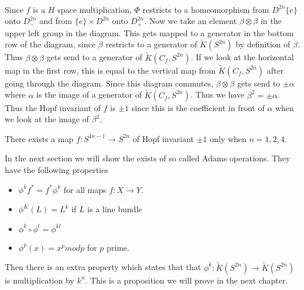 \documentclass[../Thesis.tex]{subfiles}
\begin{document}
\begin{myproof}
\\Since $f$ is a $H$ space multiplication, $\Phi$ restricts to a homeomorphism from $D^{2n}\{e\}$ onto $D^{2n}_-$ and from $\{e\} \times D^{2n}$ onto $D^{2n}_+$. Now we take an element $\beta \otimes \beta$ in the upper left group in the diagram. This gets mapped to a generator in the bottom row of the diagram, since $\beta$ restricts to a generator of $\tilde{K}(S^{2n})$ by definition of $\beta$. Thus $\beta\otimes \beta$ gets send to a generator of $\tilde{K}(C_f, S^{2n})$. If we look at the horizontal map in the first row, this is equal to the vertical map from $\tilde{K}(C_f, S^{2n})$ after going through the diagram. Since this diagram commutes, $\beta\otimes \beta$ gets send to $\pm \alpha$ where $\alpha$ is the image of a generator of $\tilde{K}(C_f, S^{2n})$. Thus we have $\beta^2 = \pm \alpha$. Thus the Hopf invariant of $f$ is $\pm 1$ since this is the coefficient in front of $\alpha$ when we look at the image of $\beta^2$. 
\end{myproof}
\begin{theorem}
There exists a map $f: S^{4n-1} \rightarrow S^{2n}$ of Hopf invariant $\pm 1$ only when $n = 1, 2, 4$.
\end{theorem}
In the next section we will show the exists of so called Adams operations. They have the following properties
\begin{itemize}
\item $\phi^k f^* = f^* \phi^k$ for all maps $f : X \rightarrow Y$.
\item $\phi^K(L) = L^k$ if $L$ is a line bundle
\item $\phi^k\circ\phi^l = \phi^{kl}$
\item $\phi^p (x) = x^p mod p$ for $p$ prime.
\end{itemize}
Then there is an extra property which states that that $\phi^k : \tilde{K}(S^{2n}) \rightarrow \tilde{K}(S^{2n})$ is multiplication by $k^n$. This is a proposition we will prove in the next chapter.
\end{document}

